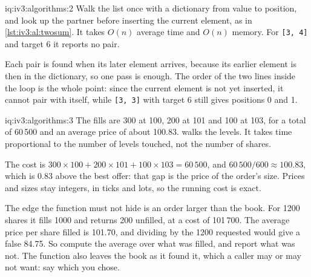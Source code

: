 \begin{solution}{iq:iv3:algorithms:2}
Walk the list once with a dictionary from value to position, and look up the partner before inserting the current element, as in \cref{lst:iv3:al:twosum}. It takes $O(n)$ average time and $O(n)$ memory. For \texttt{[3, 4]} and target 6 it reports no pair.
\label{lst:iv3:al:twosum}

Each pair is found when its later element arrives, because its earlier element is then in the dictionary, so one pass is enough. The order of the two lines inside the loop is the whole point: since the current element is not yet inserted, it cannot pair with itself, while \texttt{[3, 3]} with target 6 still gives positions 0 and 1.

\end{solution}

\begin{solution}{iq:iv3:algorithms:3}
The fills are 300 at 100, 200 at 101 and 100 at 103, for a total of 60\,500 and an average price of about 100.83.  walks the levels. It takes time proportional to the number of levels touched, not the number of shares.
\label{lst:iv3:al:sweep}

The cost is $300 \times 100 + 200 \times 101 + 100 \times 103 = 60\,500$, and $60\,500 / 600 \approx 100.83$, which is 0.83 above the best offer: that gap is the price of the order's size. Prices and sizes stay integers, in ticks and lots, so the running cost is exact.

The edge the function must not hide is an order larger than the book. For 1200 shares it fills 1000 and returns 200 unfilled, at a cost of 101\,700. The average price per share filled is 101.70, and dividing by the 1200 requested would give a false 84.75. So compute the average over what was filled, and report what was not. The function also leaves the book as it found it, which a caller may or may not want: say which you chose.

\end{solution}

